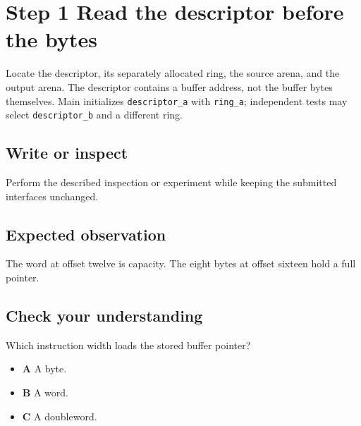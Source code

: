 \section{Step 1 Read the descriptor before the bytes}\label{ring-s01}

Locate the descriptor, its separately allocated ring, the source arena, and the output arena. The descriptor contains a buffer address, not the buffer bytes themselves. Main initializes \texttt{descriptor\_a} with \texttt{ring\_a}; independent tests may select \texttt{descriptor\_b} and a different ring.

\subsection{Write or inspect}
Perform the described inspection or experiment while keeping the submitted interfaces unchanged.

\subsection{Expected observation}
The word at offset twelve is capacity. The eight bytes at offset sixteen hold a full pointer.

\subsection{Check your understanding}
Which instruction width loads the stored buffer pointer?

\begin{itemize}
  \item \textbf{A} A byte.
  \item \textbf{B} A word.
  \item \textbf{C} A doubleword.
\end{itemize}
